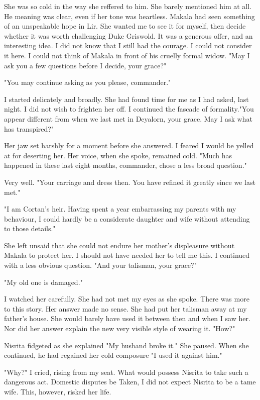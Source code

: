 \documentclass{article}
\begin{document}
She was so cold in the way she reffered to him. She barely mentioned him at all. He meaning was clear, even if her tone was heartless. Makala had seen something of an unspeakable hope in Lir. She wanted me to see it for myself, then decide whether it was worth challenging Duke Griswold. It was a generous offer, and an interesting idea. I did not know that I still had the courage. I could not consider it here. I could not think of Makala in front of his cruelly formal widow. "May I ask you a few questions before I decide, your grace?"

"You may continue asking as you please, commander."

I started delicately and broadly. She had found time for me as I had asked, last night. I did not wish to frighten her off. I continued the fascade of formality."You appear different from when we last met in Deyalorn, your grace. May I ask what has transpired?"

Her jaw set harshly for a moment before she answered. I feared I would be yelled at for deserting her. Her voice, when she spoke, remained cold. "Much has happened in these last eight months, commander, chose a less broad question."

Very well. "Your carriage and dress then. You have refined it greatly since we last met." 

"I am Cortan's heir. Having spent a year embarrassing my parents with my behaviour, I could hardly be a considerate daughter and wife without attending to those details."

She left unsaid that she could not endure her mother's displeasure without Makala to protect her. I should not have needed her to tell me this. I continued with a less obvious question. "And your talisman, your grace?"

"My old one is damaged." 

I watched her carefully. She had not met my eyes as she spoke. There was more to this story. Her answer made no sense. She had put her talisman away at my father's house. She would barely have used it between then and when I saw her. Nor did her answer explain the new very visible style of wearing it. "How?"  

Nisrita fidgeted as she explained "My husband broke it." She paused. When she continued, he had regained her cold composure "I used it against him."

"Why?" I cried, rising from my seat. What would possess Nisrita to take such a dangerous act. Domestic disputes be Taken, I did not expect Nisrita to be a tame wife. This, however, risked her life.
\end{document}

